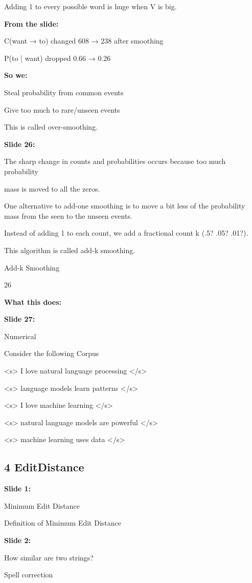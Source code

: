 \documentclass[11pt,a4paper]{article}
\begin{document}
Adding 1 to every possible word is huge when V is big.

\textbf{From the slide:} 

C(want → to) changed 608 → 238 after smoothing

P(to | want) dropped 0.66 → 0.26

\textbf{So we:} 

Steal probability from common events

Give too much to rare/unseen events

This is called over-smoothing.

\textbf{Slide 26:}

The sharp change in counts and probabilities occurs because too much probability

mass is moved to all the zeros.

One alternative to add-one smoothing is to move a bit less of the probability mass  from the seen to the unseen events.

Instead of adding 1 to each count, we add a fractional count k (.5? .05? .01?).

This algorithm is called add-k smoothing.

Add-k Smoothing

26

\textbf{What this does:} 

\textbf{Slide 27:}

Numerical

Consider the following Corpus

<s> I love natural language processing </s>

<s> language models learn patterns </s>

<s> I love machine learning </s>

<s> natural language models are powerful </s>

<s> machine learning uses data </s>


\subsection{4 EditDistance}

\textbf{Slide 1:}

Minimum Edit Distance

Definition of Minimum Edit Distance

\textbf{Slide 2:}

How similar are two strings?

Spell correction
\end{document}
